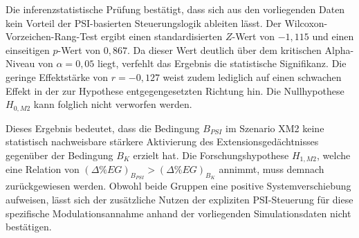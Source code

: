 Die inferenzstatistische Prüfung bestätigt, dass sich aus den vorliegenden Daten kein Vorteil der PSI-basierten Steuerungslogik ableiten lässt. Der Wilcoxon-Vorzeichen-Rang-Test ergibt einen standardisierten $Z$-Wert von $-1,115$ und einen einseitigen $p$-Wert von $0,867$. Da dieser Wert deutlich über dem kritischen Alpha-Niveau von $\alpha = 0{,}05$ liegt, verfehlt das Ergebnis die statistische Signifikanz. Die geringe Effektstärke von $r = -0,127$ weist zudem lediglich auf einen schwachen Effekt in der zur Hypothese entgegengesetzten Richtung hin. Die Nullhypothese $H_{0, M2}$ kann folglich nicht verworfen werden.

Dieses Ergebnis bedeutet, dass die Bedingung $B_{PSI}$ im Szenario XM2 keine statistisch nachweisbare stärkere Aktivierung des Extensionsgedächtnisses gegenüber der Bedingung $B_{K}$ erzielt hat. Die Forschungshypothese $H_{1, M2}$, welche eine Relation von $(\Delta\%EG)_{B_{PSI}} > (\Delta\%EG)_{B_{K}}$ annimmt, muss demnach zurückgewiesen werden. Obwohl beide Gruppen eine positive Systemverschiebung aufweisen, lässt sich der zusätzliche Nutzen der expliziten PSI-Steuerung für diese spezifische Modulationsannahme anhand der vorliegenden Simulationsdaten nicht bestätigen.




